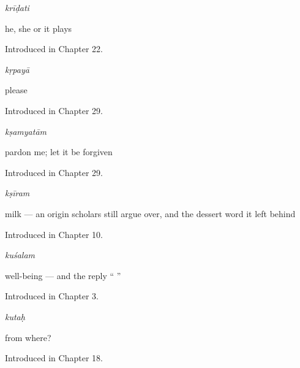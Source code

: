 \noindent\begin{minipage}[t]{\linewidth}
\raggedright
\textbf{}\enspace\emph{krīḍati}\par
\small he, she or it plays\par
\footnotesize Introduced in Chapter 22.
\end{minipage}\par\medskip

\noindent\begin{minipage}[t]{\linewidth}
\raggedright
\textbf{}\enspace\emph{kṛpayā}\par
\small please\par
\footnotesize Introduced in Chapter 29.
\end{minipage}\par\medskip

\noindent\begin{minipage}[t]{\linewidth}
\raggedright
\textbf{}\enspace\emph{kṣamyatām}\par
\small pardon me; let it be forgiven\par
\footnotesize Introduced in Chapter 29.
\end{minipage}\par\medskip

\noindent\begin{minipage}[t]{\linewidth}
\raggedright
\textbf{}\enspace\emph{kṣīram}\par
\small milk — an origin scholars still argue over, and the dessert word it left behind\par
\footnotesize Introduced in Chapter 10.
\end{minipage}\par\medskip

\noindent\begin{minipage}[t]{\linewidth}
\raggedright
\textbf{}\enspace\emph{kuśalam}\par
\small well-being — and the reply \textquotedblleft{}  \textquotedblright{}\par
\footnotesize Introduced in Chapter 3.
\end{minipage}\par\medskip

\noindent\begin{minipage}[t]{\linewidth}
\raggedright
\textbf{}\enspace\emph{kutaḥ}\par
\small from where?\par
\footnotesize Introduced in Chapter 18.
\end{minipage}\par\medskip

